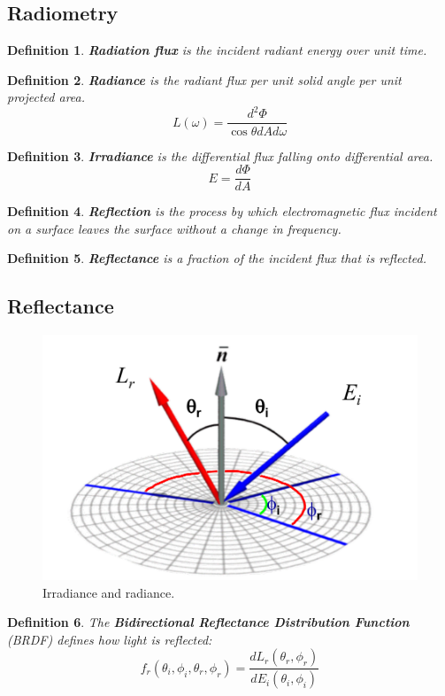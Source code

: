 \documentclass[11pt]{article}
\newtheorem{defn}{Definition}
\begin{document}
\subsection{Radiometry}
\begin{defn}
  \textbf{Radiation flux} is the incident radiant energy over unit time.
\end{defn}

\begin{defn}
  \textbf{Radiance} is the radiant flux per unit solid angle per unit projected area.
  \[
    L(\omega) = \frac{d^2 \Phi}{\cos \theta dAd\omega} 
  \]
\end{defn}

\begin{defn}
  \textbf{Irradiance} is the differential flux falling onto differential area.
  \[
    E = \frac{d\Phi}{dA}
  \]
\end{defn}

\begin{defn}
  \textbf{Reflection} is the process by which electromagnetic flux incident on a surface leaves the surface without a change in frequency.
\end{defn}

\begin{defn}
  \textbf{Reflectance} is a fraction of the incident flux that is reflected.
\end{defn}

\subsection{Reflectance}
\begin{figure}[htb!]
  \centering
  \caption{Irradiance and radiance.}
  \includegraphics[scale=0.3]{brdf}
\end{figure}
\begin{defn}
  The \textbf{Bidirectional Reflectance Distribution Function} (BRDF) defines how light is reflected:
  \[
    f_r(\theta_i, \phi_i, \theta_r, \phi_r) = \frac{dL_r (\theta_r, \phi_r)}{dE_i (\theta_i, \phi_i)}  
  \]
\end{defn}
\end{document}
